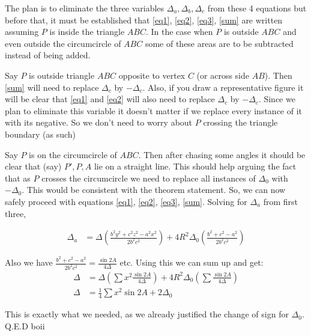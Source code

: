 \documentclass{article}
\begin{document}
The plan is to eliminate the three variables $\Delta_a, \Delta_b, \Delta_c$ from these 4 equations but before that, it must be established that \eqref{eq1}, \eqref{eq2}, \eqref{eq3}, \eqref{sum} are written assuming $P$ is inside the triangle $ABC$. In the case when $P$ is outside $ABC$ and even outside the circumcircle of $ABC$ some of these areas are to be subtracted instead of being added.

Say $P$ is outside triangle $ABC$ opposite to vertex $C$ (or across side $AB$). Then \eqref{sum} will need to replace $\Delta_c$ by $-\Delta_c$. Also, if you draw a representative figure it will be clear that \eqref{eq1} and \eqref{eq2} will also need to replace $\Delta_c$ by $-\Delta_c$. Since we plan to eliminate this variable it doesn't matter if we replace every instance of it with its negative. So we don't need to worry about $P$ crossing the triangle boundary (as such)

Say $P$ is on the circumcircle of $ABC$. Then after chasing some angles it should be clear that (say) $P',P,A$ lie on a straight line. This should help arguing the fact that as $P$ crosses the circumcircle we need to replace all instances of $\Delta_0$ with $-\Delta_0$. This would be consistent with the theorem statement. So, we can now safely proceed with equations \eqref{eq1}, \eqref{eq2}, \eqref{eq3}, \eqref{sum}. Solving for $\Delta_a$ from first three,

\begin{align}
    \Delta_a &= \Delta \left(\frac{b^2y^2 + c^2z^2 - a^2x^2}{2b^2c^2}\right) + 4R^2\Delta_0\left(\frac{b^2+c^2-a^2}{2b^2c^2}\right)
\end{align}

Also we have $\frac{b^2+c^2-a^2}{2b^2c^2} = \frac{\sin 2A}{4\Delta}$ etc. Using this we can sum up and get:
\begin{align}
    \Delta &= \Delta\left(\sum x^2 \frac{\sin 2A}{4\Delta}\right) + 4R^2\Delta_0\left(\sum \frac{\sin 2A}{4\Delta}\right) \\
    \Delta &= \frac{1}{4}\sum x^2\sin 2A + 2\Delta_0
\end{align}

This is exactly what we needed, as we already justified the change of sign for $\Delta_0$.
Q.E.D boii
\end{document}
